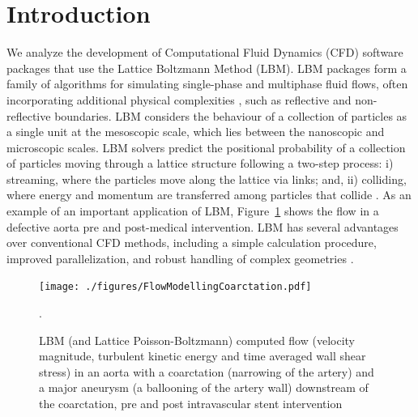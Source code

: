 \documentclass[final, 3p, times, authoryear]{elsarticle}
\begin{document}

\section{Introduction} \label{secIntro}

We analyze the development of Computational Fluid Dynamics (CFD) software
packages that use the Lattice Boltzmann Method (LBM). LBM packages form a family
of algorithms for simulating single-phase and multiphase fluid flows, often
incorporating additional physical complexities \citep{chen1998lattice}, such as
reflective and non-reflective boundaries. LBM considers the behaviour of a
collection of particles as a single unit at the mesoscopic scale, which lies
between the nanoscopic and microscopic scales. LBM solvers predict the
positional probability of a collection of particles moving through a lattice
structure following a two-step process: i) streaming, where the particles move
along the lattice via links; and, ii) colliding, where energy and momentum are
transferred among particles that collide \citep{bao2011lattice}. As an example
of an important application of LBM, Figure~\ref{Fig_coarctation} shows the flow
in a defective aorta pre and post-medical intervention. LBM has several
advantages over conventional CFD methods, including a simple calculation
procedure, improved parallelization, and robust handling of complex geometries
\citep{ganji2015application}.

\begin{figure}[h!]
	\begin{center}
		\texttt{[image: ./figures/FlowModellingCoarctation.pdf]}
		\caption{LBM (and Lattice Poisson-Boltzmann) computed flow (velocity
		magnitude, turbulent kinetic energy and time averaged wall shear stress)
		in an aorta with a coarctation (narrowing of the artery) and a major
		aneurysm (a ballooning of the artery wall) downstream of the
		coarctation, pre and post intravascular stent intervention
		\citep{SadeghiEtAl2020}}.
		\label{Fig_coarctation}
	\end{center}
\end{figure}
\end{document}
